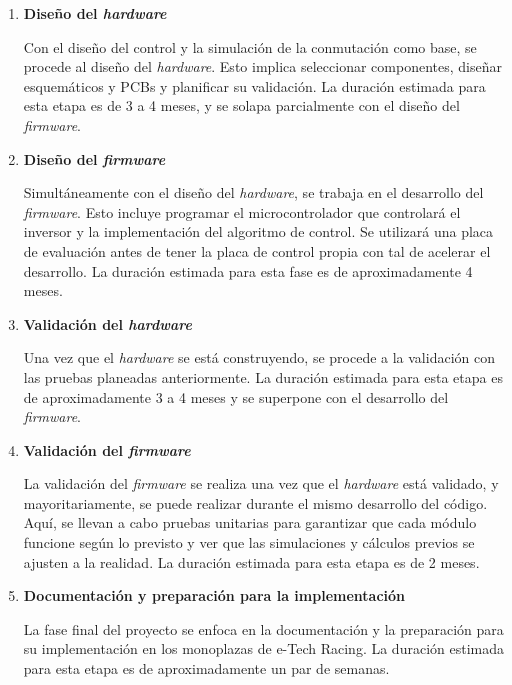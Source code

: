 \begin{enumerate}
\item \textbf{Diseño del \textit{hardware}}

Con el diseño del control y la simulación de la conmutación como base, se procede al diseño del \textit{hardware}. Esto implica seleccionar componentes, diseñar esquemáticos y PCBs y planificar su validación. La duración estimada para esta etapa es de 3 a 4 meses, y se solapa parcialmente con el diseño del \textit{firmware}.

\item \textbf{Diseño del \textit{firmware}}

Simultáneamente con el diseño del \textit{hardware}, se trabaja en el desarrollo del \textit{firmware}. Esto incluye programar el microcontrolador que controlará el inversor y la implementación del algoritmo de control. Se utilizará una placa de evaluación antes de tener la placa de control propia con tal de acelerar el desarrollo. La duración estimada para esta fase es de aproximadamente 4 meses.

\item \textbf{Validación del \textit{hardware}}

Una vez que el \textit{hardware} se está construyendo, se procede a la validación con las pruebas planeadas anteriormente. La duración estimada para esta etapa es de aproximadamente 3 a 4 meses y se superpone con el desarrollo del \textit{firmware}.

\item \textbf{Validación del \textit{firmware}}

La validación del \textit{firmware} se realiza una vez que el \textit{hardware} está validado, y mayoritariamente, se puede realizar durante el mismo desarrollo del código. Aquí, se llevan a cabo pruebas unitarias para garantizar que cada módulo funcione según lo previsto y ver que las simulaciones y cálculos previos se ajusten a la realidad. La duración estimada para esta etapa es de 2 meses.

\item \textbf{Documentación y preparación para la implementación}

La fase final del proyecto se enfoca en la documentación y la preparación para su implementación en los monoplazas de e-Tech Racing. La duración estimada para esta etapa es de aproximadamente un par de semanas. 

\end{enumerate}

\newpage

